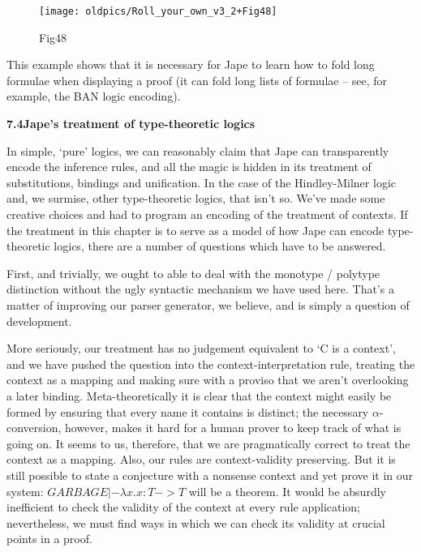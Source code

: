 \documentclass[11pt]{book}
\newcommand{\tab}{\hspace{5mm}}
\begin{document}
\begin{figure}[htbp] \begin{center} \texttt{[image: oldpics/Roll\_your\_own\_v3\_2+Fig48]} \caption{Fig48} \end{center} \end{figure}


This example shows that it is necessary for Jape to learn how to fold long formulae when displaying a proof (it can fold long lists of formulae -- see, for example, the BAN logic encoding).


\textbf{{\large 7.4\tab Jape's treatment of type-theoretic logics}}


In simple, `pure' logics, we can reasonably claim that Jape can transparently encode the inference rules, and all the magic is hidden in its treatment of substitutions, bindings and unification. In the case of the Hindley-Milner logic and, we surmise, other type-theoretic logics, that isn't so. We've made some creative choices and had to program an encoding of the treatment of contexts. If the treatment in this chapter is to serve as a model of how Jape can encode type-theoretic logics, there are a number of questions which have to be answered.


First, and trivially, we ought to able to deal with the monotype / polytype distinction without the ugly syntactic mechanism we have used here. That's a matter of improving our parser generator, we believe, and is simply a question of development.


More seriously, our treatment has no judgement equivalent to `C is a context', and we have pushed the question into the context-interpretation rule, treating the context as a mapping and making sure with a proviso that we aren't overlooking a later binding. Meta-theoretically it is clear that the context might easily be formed by ensuring that every name it contains is distinct; the necessary \ensuremath{\alpha}-conversion, however, makes it hard for a human prover to keep track of what is going on. It seems to us, therefore, that we are pragmatically correct to treat the context as a mapping. Also, our rules are context-validity preserving. But it is still possible to state a conjecture with a nonsense context and yet prove it in our system: $GARBAGE |- \lambda x.x:T->T$ will be a theorem. It would be absurdly inefficient to check the validity of the context at every rule application; nevertheless, we must find ways in which we can check its validity at crucial points in a proof.
\end{document}
